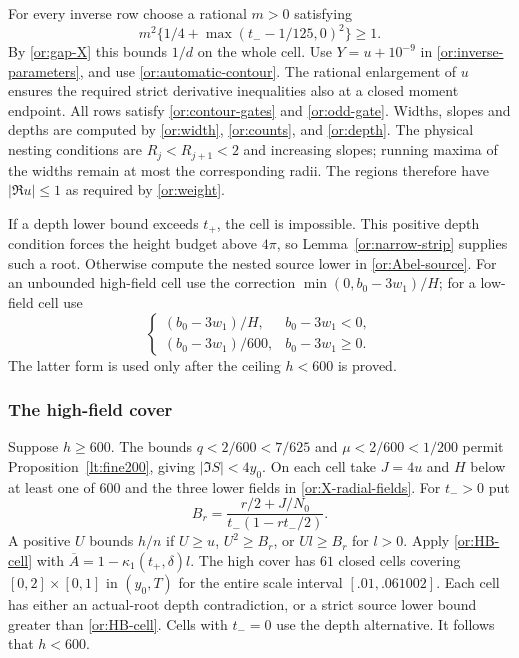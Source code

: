For every inverse row choose a rational $m>0$ satisfying
\begin{equation}\label{or:X-m-cell}
              m^2\{1/4+\max(t_--1/125,0)^2\}\ge1.
\end{equation}
By \eqref{or:gap-X} this bounds $1/d$ on the whole cell.  Use
$Y=u+10^{-9}$ in \eqref{or:inverse-parameters}, and use
\eqref{or:automatic-contour}.  The rational enlargement of $u$
ensures the required strict derivative inequalities also at a closed
moment endpoint.  All rows satisfy \eqref{or:contour-gates} and
\eqref{or:odd-gate}.  Widths, slopes and depths are computed by
\eqref{or:width}, \eqref{or:counts}, and \eqref{or:depth}.
The physical nesting conditions are $R_j<R_{j+1}<2$ and increasing
slopes; running maxima of the widths remain at most the corresponding
radii.  The regions therefore have $|\Re u|\le1$ as required by
\eqref{or:weight}.

If a depth lower bound exceeds $t_+$, the cell is impossible.  This
positive depth condition forces the height budget above $4\pi$,
so Lemma~\ref{or:narrow-strip} supplies such a root.
Otherwise compute the nested source lower in \eqref{or:Abel-source}.
For an unbounded high-field cell use the correction
$\min(0,b_0-3w_1)/H$; for a low-field cell use
\begin{equation}\label{or:X-signed-correction}
 \begin{cases}
  (b_0-3w_1)/H,&b_0-3w_1<0,\\
  (b_0-3w_1)/600,&b_0-3w_1\ge0.
 \end{cases}
\end{equation}
The latter form is used only after the ceiling $h<600$ is proved.

\subsubsection{The high-field cover}

Suppose $h\ge600$.  The bounds $q<2/600<7/625$ and
$\mu<2/600<1/200$ permit
Proposition~\ref{lt:fine200}, giving $|\Im S|<4y_0$.
On each cell take $J=4u$ and $H$ below at least one of $600$ and
the three lower fields in \eqref{or:X-radial-fields}.
For $t_->0$ put
\begin{equation}\label{or:X-high-radial}
       B_r=\frac{r/2+J/N_0}{t_-(1-rt_-/2)}.
\end{equation}
A positive $U$ bounds $h/n$ if $U\ge u$, $U^2\ge B_r$, or
$Ul\ge B_r$ for $l>0$.  Apply \eqref{or:HB-cell} with
$\overline A=1-\kappa_1(t_+,\delta)l$.  The high cover has
$61$ closed cells covering $[0,2]\times[0,1]$ in $(y_0,T)$ for
the entire scale interval $[.01,.061002]$.  Each cell has either
an actual-root depth contradiction, or a strict source lower bound
greater than \eqref{or:HB-cell}.  Cells with $t_-=0$ use the
depth alternative.  It follows that $h<600$.

